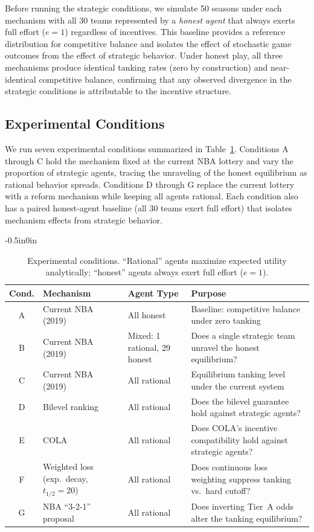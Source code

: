 \documentclass{article}
\begin{document}
Before running the strategic conditions, we simulate 50 seasons under each
mechanism with all 30 teams represented by a \emph{honest agent} that always
exerts full effort ($e = 1$) regardless of incentives.
This baseline provides a reference distribution for competitive balance and
isolates the effect of stochastic game outcomes from the effect of strategic
behavior.
Under honest play, all three mechanisms produce identical tanking rates (zero
by construction) and near-identical competitive balance, confirming that any
observed divergence in the strategic conditions is attributable to the
incentive structure.

\subsection{Experimental Conditions}
\label{sec:conditions}

We run seven experimental conditions summarized in Table~\ref{tab:conditions}.
Conditions A through C hold the mechanism fixed at the current NBA lottery and
vary the proportion of strategic agents, tracing the unraveling of the honest
equilibrium as rational behavior spreads.
Conditions D through G replace the current lottery with a reform mechanism
while keeping all agents rational.
Each condition also has a paired honest-agent baseline (all 30 teams exert
full effort) that isolates mechanism effects from strategic behavior.

\begin{adjustwidth}{-0.5in}{0in}
\begin{table}[h]
\centering
\renewcommand{\arraystretch}{1.3}
\begin{tabular}{cllp{5.6cm}}
\toprule
\textbf{Cond.} & \textbf{Mechanism} & \textbf{Agent Type} & \textbf{Purpose} \\
\midrule
A & Current NBA (2019) & All honest
  & Baseline: competitive balance under zero tanking \\
B & Current NBA (2019) & Mixed: 1 rational, 29 honest
  & Does a single strategic team unravel the honest equilibrium? \\
C & Current NBA (2019) & All rational
  & Equilibrium tanking level under the current system \\
D & Bilevel ranking \citep{kazachkov2020} & All rational
  & Does the bilevel guarantee hold against strategic agents? \\
E & COLA \citep{highley2026} & All rational
  & Does COLA's incentive compatibility hold against strategic agents? \\
F & Weighted loss (exp.\ decay, $t_{1/2} = 20$) & All rational
  & Does continuous loss weighting suppress tanking vs.\ hard cutoff? \\
G & NBA ``3-2-1'' proposal & All rational
  & Does inverting Tier~A odds alter the tanking equilibrium? \\
\bottomrule
\end{tabular}
\caption{Experimental conditions. ``Rational'' agents maximize expected
utility analytically; ``honest'' agents always exert full effort ($e = 1$).}
\label{tab:conditions}
\end{table}
\end{adjustwidth}
\end{document}
